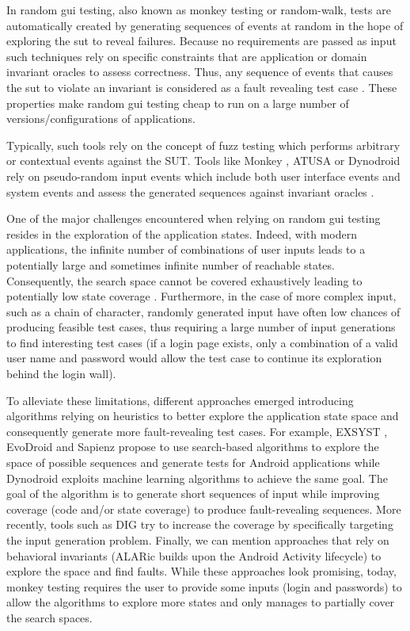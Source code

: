 In random \gls{gui} testing, also known as monkey testing or random-walk, tests are automatically created by generating sequences of events at random in the hope of exploring the \gls{sut} to reveal failures. Because no requirements are passed as input such techniques rely on specific constraints that are application or domain invariant oracles \cite{Mesbah2009} to assess correctness. Thus, any sequence of events that causes the \gls{sut} to violate an invariant is considered as a fault revealing test case \cite{Barr2015}. These properties make random \gls{gui} testing cheap to run on a large number of versions/configurations of applications.

Typically, such tools rely on the concept of fuzz testing which performs arbitrary or contextual events against the SUT. Tools like Monkey \cite{Google2020},  ATUSA \cite{Mesbah2012} or Dynodroid \cite{Machiry2013} rely on pseudo-random input events which include both user interface events and system events and assess the generated sequences against invariant oracles \cite{Amalfitano2011}. 

One of the major challenges encountered when relying on random \gls{gui} testing resides in the exploration of the application states. Indeed, with modern applications, the infinite number of combinations of user inputs leads to a potentially large and sometimes infinite number of reachable states. Consequently, the search space cannot be covered exhaustively leading to potentially low state coverage \cite{Canny2019}. Furthermore, in the case of more complex input, such as a chain of character, randomly generated input have often low chances of producing feasible test cases, thus requiring a large number of input generations to find interesting test cases (\eg if a login page exists, only a combination of a valid user name and password would allow the test case to continue its exploration behind the login wall).

To alleviate these limitations, different approaches emerged introducing algorithms relying on heuristics to better explore the application state space and consequently generate more fault-revealing test cases. For example, EXSYST \cite{Gross2012}, EvoDroid \cite{Mahmood2014} and Sapienz \cite{Mao2016} propose to use search-based algorithms to explore the space of possible sequences and generate tests for Android applications while Dynodroid \cite{Machiry2013} exploits machine learning algorithms to achieve the same goal. The goal of the algorithm is to generate short sequences of input while improving coverage (code \cite{Gross2012} and/or state \cite{Machiry2013} coverage) to produce fault-revealing sequences. More recently, tools such as DIG \cite{Biagiola2019} try to increase the coverage by specifically targeting the input generation problem. Finally, we can mention approaches that rely on behavioral invariants (\eg ALARic \cite{Riccio2018} builds upon the Android Activity lifecycle) to explore the space and find faults. While these approaches look promising, today, monkey testing requires the user to provide some inputs (\eg login and passwords) to allow the algorithms to explore more states and only manages to partially cover the search spaces.

